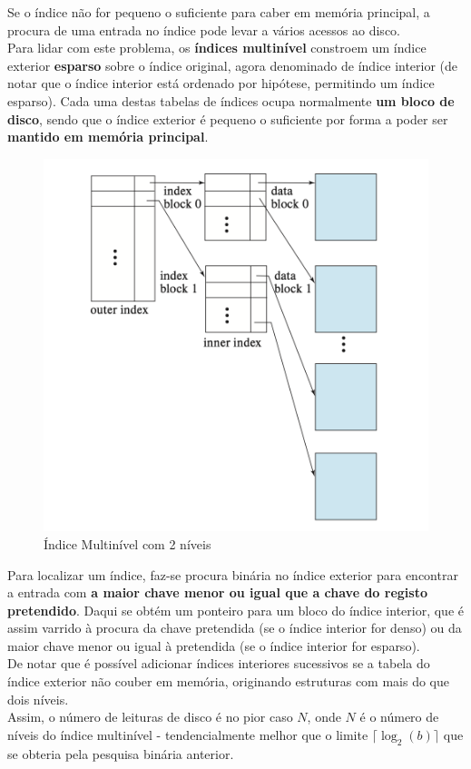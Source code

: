 \documentclass[oneside]{book}
\theoremstyle{definition}
\begin{document}
Se o índice não for pequeno o suficiente para caber em memória principal, a procura de uma entrada no índice pode levar a vários acessos ao disco.\\
Para lidar com este problema, os \textbf{índices multinível} constroem um índice exterior \textbf{esparso} sobre o índice original, agora denominado de índice interior (de notar que o índice interior está ordenado por hipótese, permitindo um índice esparso). Cada uma destas tabelas de índices ocupa normalmente \textbf{um bloco de disco}, sendo que o índice exterior é pequeno o suficiente por forma a poder ser \textbf{mantido em memória principal}.
\begin{figure}[H]
    \centering
    \includegraphics[scale = 0.50]{cap_indices/indice_multinivel.png}
    \caption{Índice Multinível com 2 níveis}
\end{figure}
Para localizar um índice, faz-se procura binária no índice exterior para encontrar a entrada com \textbf{a maior chave menor ou igual que a chave do registo pretendido}. Daqui se obtém um ponteiro para um bloco do índice interior, que é assim varrido à procura da chave pretendida (se o índice interior for denso) ou da maior chave menor ou igual à pretendida (se o índice interior for esparso). \\
De notar que é possível adicionar índices interiores sucessivos se a tabela do índice exterior não couber em memória, originando estruturas com mais do que dois níveis.\\
Assim, o número de leituras de disco é no pior caso $N$, onde $N$ é o número de níveis do índice multinível - tendencialmente melhor que o limite $\lceil\log_2(b)\rceil$ que se obteria pela pesquisa binária anterior.
\end{document}
